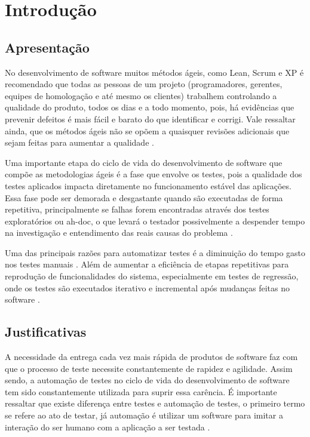 \chapter{Introdução}

\section{Apresentação}

No desenvolvimento de software muitos métodos ágeis, como Lean, Scrum e XP é recomendado que todas as pessoas de um projeto (programadores, gerentes, equipes de homologação e até mesmo os clientes) trabalhem controlando a qualidade do produto, todos os dias e a todo momento, pois, há evidências que prevenir defeitos é mais fácil e barato do que identificar e corrigi. Vale ressaltar ainda, que os métodos ágeis não se opõem a quaisquer revisões adicionais que sejam feitas para aumentar a qualidade \cite{inportanciaTestesAutomatizados}.

Uma importante etapa do ciclo de vida do desenvolvimento de software que compõe as metodologias ágeis é a fase que envolve os testes, pois a qualidade dos testes aplicados impacta diretamente no funcionamento estável das aplicações. Essa fase pode ser demorada e desgastante quando são executadas de forma repetitiva, principalmente se falhas forem encontradas através dos testes exploratórios ou ah-doc, o que levará o testador possivelmente a despender tempo na investigação e entendimento das reais causas do problema \cite{XiangFeng2011}.

Uma das principais razões para automatizar testes é a diminuição do tempo gasto nos testes manuais \cite{Maldonado1988}. Além de aumentar a eficiência de etapas repetitivas para reprodução de funcionalidades do sistema, especialmente em testes de regressão, onde os testes são executados iterativo e incremental após mudanças feitas no software \cite{Collins2012}.

\section{Justificativas}

A necessidade da entrega cada vez mais rápida de produtos de software faz com que o processo de teste necessite constantemente de rapidez e agilidade. Assim sendo, a automação de testes no ciclo de vida do desenvolvimento de software tem sido constantemente utilizada para suprir essa carência. É importante ressaltar que existe diferença entre testes e automação de testes, o primeiro termo se refere ao ato de testar, já automação é utilizar um software para imitar a interação do ser humano com a aplicação a ser testada \cite{Wanessa2012}.

